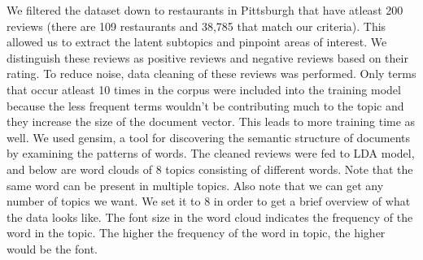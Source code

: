 \documentclass{neu_handout}
\begin{document}
We filtered the dataset down to restaurants in Pittsburgh that have atleast 200 reviews (there are 109 restaurants and 38,785 that match our criteria). This allowed us to extract the latent subtopics and pinpoint areas of interest. We distinguish these reviews as positive reviews and negative reviews based on their rating. To reduce noise, data cleaning of these reviews was performed. Only terms that occur atleast 10 times in the corpus were included into the training model because the less frequent terms wouldn't be contributing much to the topic and they increase the size of the document vector. This leads to more training time as well. We used gensim, a tool for discovering the semantic structure of documents by examining the patterns of words. The cleaned reviews were fed to LDA model, and below are word clouds of 8 topics consisting of different words. Note that the same word can be present in multiple topics. Also note that we can get any number of topics we want. We set it to 8 in order to get a brief overview of what the data looks like. The font size in the word cloud indicates the frequency of the word in the topic. The higher the frequency of the word in topic, the higher would be the font.
\end{document}
